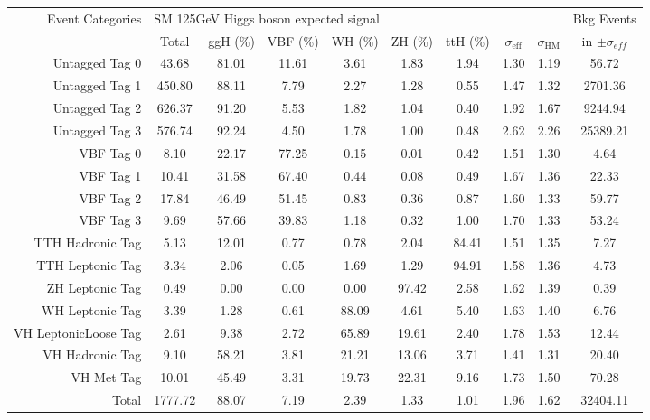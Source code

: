 \begin{tabular}{ |r | c | c | c  | c |  c |  c |  c |  c |  c | }
\hline
\hline
\hline
\multirow{2}{*}{Event Categories} &\multicolumn{8}{|l|}{SM 125GeV Higgs boson expected signal} & Bkg Events\\ \cline{2-9}
  &  Total & ggH (\%) & VBF (\%) & WH (\%) & ZH (\%) & ttH (\%) &   $\sigma_{\text{eff}} $  & $\sigma_{\text{HM}} $ & in $ \pm \sigma_{eff}$  \\
  \hline
  \hline
  Untagged Tag 0 &    43.68  &  81.01  &  11.61  &  3.61  &  1.83  &  1.94 & 1.30 & 1.19 & 56.72 \\
  Untagged Tag 1 &    450.80  &  88.11  &  7.79  &  2.27  &  1.28  &  0.55 & 1.47 & 1.32 & 2701.36 \\
  Untagged Tag 2 &    626.37  &  91.20  &  5.53  &  1.82  &  1.04  &  0.40 & 1.92 & 1.67 & 9244.94 \\
  Untagged Tag 3 &    576.74  &  92.24  &  4.50  &  1.78  &  1.00  &  0.48 & 2.62 & 2.26 & 25389.21 \\
  VBF Tag 0 &    8.10  &  22.17  &  77.25  &  0.15  &  0.01  &  0.42 & 1.51 & 1.30 & 4.64 \\
  VBF Tag 1 &    10.41  &  31.58  &  67.40  &  0.44  &  0.08  &  0.49 & 1.67 & 1.36 & 22.33 \\
  VBF Tag 2 &    17.84  &  46.49  &  51.45  &  0.83  &  0.36  &  0.87 & 1.60 & 1.33 & 59.77 \\
  VBF Tag 3 &    9.69  &  57.66  &  39.83  &  1.18  &  0.32  &  1.00 & 1.70 & 1.33 & 53.24 \\
  TTH Hadronic Tag &    5.13  &  12.01  &  0.77  &  0.78  &  2.04  &  84.41 & 1.51 & 1.35 & 7.27 \\
  TTH Leptonic Tag &    3.34  &  2.06  &  0.05  &  1.69  &  1.29  &  94.91 & 1.58 & 1.36 & 4.73 \\
  ZH Leptonic Tag &    0.49  &  0.00  &  0.00  &  0.00  &  97.42  &  2.58 & 1.62 & 1.39 & 0.39 \\
  WH Leptonic Tag &    3.39  &  1.28  &  0.61  &  88.09  &  4.61  &  5.40 & 1.63 & 1.40 & 6.76 \\
  VH LeptonicLoose Tag &    2.61  &  9.38  &  2.72  &  65.89  &  19.61  &  2.40 & 1.78 & 1.53 & 12.44 \\
  VH Hadronic Tag &    9.10  &  58.21  &  3.81  &  21.21  &  13.06  &  3.71 & 1.41 & 1.31 & 20.40 \\
  VH Met Tag &    10.01  &  45.49  &  3.31  &  19.73  &  22.31  &  9.16 & 1.73 & 1.50 & 70.28 \\
  Total &    1777.72  &  88.07  &  7.19  &  2.39  &  1.33  &  1.01 & 1.96 & 1.62 & 32404.11 \\
  \hline
  \hline
  \end{tabular}
